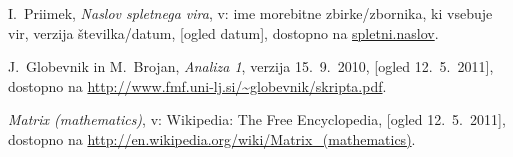 \documentclass[mat1]{fmfdelo}
\begin{document}
\begin{thebibliography}{99}
I.~Priimek, \emph{Naslov spletnega vira}, v: ime morebitne zbirke/zbornika, ki vsebuje vir, verzija številka/datum, [ogled datum], dostopno na \url{spletni.naslov}.

J.~Globevnik in M.~Brojan, \emph{Analiza 1}, verzija 15.~9.~2010, [ogled 12.~5.~2011], dostopno na \url{http://www.fmf.uni-lj.si/~globevnik/skripta.pdf}.

\emph{Matrix (mathematics)}, v: Wikipedia: The Free Encyclopedia, [ogled 12.~5.~2011], dostopno na \url{http://en.wikipedia.org/wiki/Matrix_(mathematics)}.





\end{thebibliography}
\end{document}
